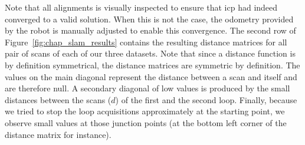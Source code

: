 Note that all alignments is visually inspected to ensure that \gls*{icp} had indeed converged to a valid solution. When this is not the case, the odometry provided by the robot is manually adjusted to enable this convergence. The second row of Figure~\ref{fig:chap_slam_results} contains the resulting distance matrices for all pair of scans of each of our three datasets. Note that since a distance function is by definition symmetrical, the distance matrices are symmetric by definition. The values on the main diagonal represent the distance between a scan and itself and are therefore null. A secondary diagonal of low values is produced by the small distances between the scans ($d$) of the first and the second loop. Finally, because we tried to stop the loop acquisitions approximately at the starting point, we observe small values at those junction points (at the bottom left corner of the distance matrix for instance).

